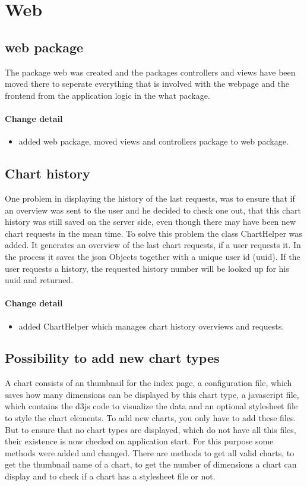 \section{Web}
\subsection{web package}
The package web was created and the packages controllers and views have been moved there to seperate everything that is involved with the webpage and the frontend from the application logic in the what package.

\paragraph{Change detail}
\begin{itemize}
  \item added web package, moved views and controllers package to web package.
\end{itemize}

\subsection{Chart history}
One problem in displaying the history of the last requests, was to ensure that if an overview was sent to the user and he decided to check one out,
 that this chart history was still saved on the server side, even though there may have been new chart requests in the mean time.
To solve this problem the class ChartHelper was added. It generates an overview of the last chart requests, 
if a user requests it. In the process it saves the json Objects together with a unique user id (uuid). 
If the user requests a history, the requested history number will be looked up for his uuid and returned.

\paragraph{Change detail}
\begin{itemize}
  \item added ChartHelper which manages chart history overviews and requests.
\end{itemize}

\subsection{Possibility to add new chart types}
A chart consists of an thumbnail for the index page, a configuration file, which saves how many dimensions can be displayed by this chart type,
a javascript file, which contains the d3js code to visualize the data and an optional stylesheet file to style the chart elements.
To add new charts, you only have to add these files.
But to ensure that no chart types are displayed, which do not have all this files, their existence is now checked on application start.
For this purpose some methods were added and changed. There are methods to get all valid charts, to get the thumbnail name of a chart,
to get the number of dimensions a chart can display and to check if a chart has a stylesheet file or not.

